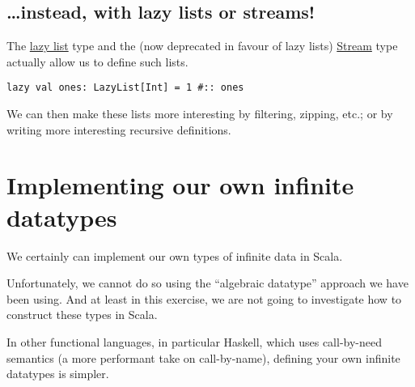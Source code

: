 \documentclass[11pt]{article}
\begin{document}
\subsection{…instead, with lazy lists or streams!}
\label{sec:org61bd68e}

The \href{https://www.scala-lang.org/api/current/scala/collection/immutable/LazyList.html}{lazy list} type and
the (now deprecated in favour of lazy lists) \href{https://www.scala-lang.org/api/current/scala/collection/immutable/Stream.html}{Stream} type
actually allow us to define such lists.
\begin{verbatim}
lazy val ones: LazyList[Int] = 1 #:: ones
\end{verbatim}

We can then make these lists more interesting
by filtering, zipping, etc.;
or by writing more interesting recursive definitions.

\section{Implementing our own infinite datatypes}
\label{sec:org31e440d}

We certainly can implement our own types of infinite data in Scala.

Unfortunately, we cannot do so using the “algebraic datatype”
approach we have been using.
And at least in this exercise, we are not going to
investigate how to construct these types in Scala.

In other functional languages, in particular Haskell,
which uses call-by-need semantics (a more performant
take on call-by-name), defining your own infinite datatypes
is simpler.
\end{document}
